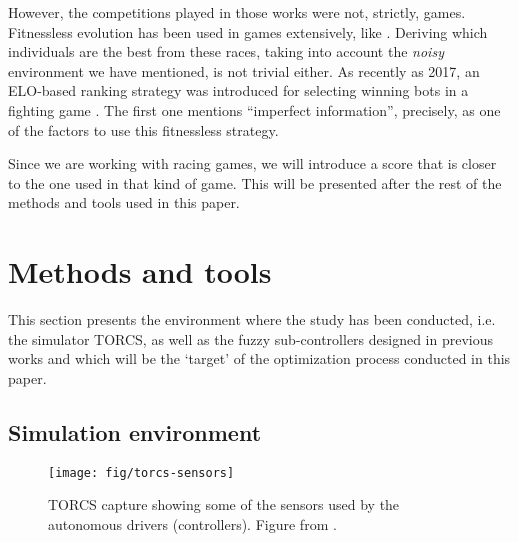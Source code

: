 \documentclass[10pt,journal,compsoc]{IEEEtran}
\begin{document}
However, the competitions played in those works were not, strictly,
games. Fitnessless evolution has been used in games extensively, like
\cite{Jaskowski2008,10.1007/978-3-540-78671-9_2,fernandez2016_only_one}.
Deriving which individuals are the best from these races, taking into account
the {\em noisy} environment we have mentioned, is not trivial
either. As recently as 2017, an ELO-based ranking strategy was
introduced for selecting winning bots in a fighting game
\cite{7792145}. The first one mentions ``imperfect information'',
precisely, as one of the factors to use this fitnessless strategy.

Since we are working with racing games, we will introduce a score that
is closer to the one used in that kind of game. This will be
presented after the rest of the methods and tools used in this paper. 



\section{Methods and tools}
\label{sec:methods}

This section presents the environment where the study has been conducted, i.e. the simulator TORCS, as well as the fuzzy sub-controllers designed in previous works and which will be the `target' of the optimization process conducted in this paper. 

%

\subsection{Simulation environment}

\begin{figure}[!ht] 
	\begin{center}
		\texttt{[image: fig/torcs-sensors]}
		\caption {TORCS capture showing some of the sensors
                used by the autonomous drivers (controllers). Figure from \cite{DBLP:conf/cig/SalemMG19}.}
		\label{fig:torcs-sensors}
	\end{center}
\end{figure}
\end{document}
